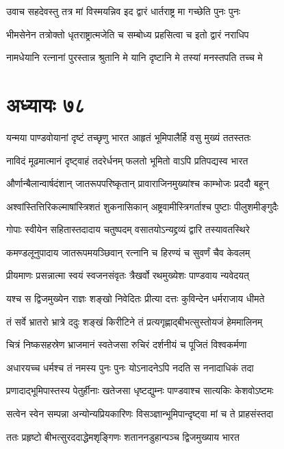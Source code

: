 \twolineshloka
{उवाच सहदेवस्तु तत्र मां विस्मयन्निव}
{इद द्वारं धार्तराष्ट्र मा गच्छेति पुनः पुनः}


\twolineshloka
{भीमसेनेन तत्रोक्तो धृतराष्ट्रात्मजेति च}
{सम्बोध्य प्रहसित्वा च इतो द्वारं नराधिप}


\twolineshloka
{नामधेयानि रत्नानां पुरस्तान्न श्रुतानि मे}
{यानि दृष्टानि मे तस्यां मनस्तपति तच्च मे}


\chapter{अध्यायः ७८}
\twolineshloka
{यन्मया पाण्डवोयानां दृष्टं तच्छृणु भारत}
{आहृतं भूमिपालैर्हि वसु मुख्यं ततस्ततः}


\twolineshloka
{नाविदं मूढमात्मानं दृष्ट्वाहं तदरेर्धनम्}
{फलतो भूमितो वाऽपि प्रतिपद्यस्व भारत}


\twolineshloka
{और्णान्बैलान्वार्षदंशान् जातरूपपरिष्कृतान्}
{प्रावाराजिनमुख्यांश्च काम्भोजः प्रददौ बहून्}


\twolineshloka
{अश्वांस्तित्तिरिकल्माषांस्त्रिशतं शुकनासिकान्}
{अष्ट्रवामीस्त्रिगर्ताश्च पुष्टाः पीलुशमीङ्गुदैः}


\twolineshloka
{गोपाः स्वीयेन सहितास्तदादाय चतुष्पदम्}
{वसातयोऽन्यद्द्रव्यं द्वारि तस्यावतस्थिरे}


\threelineshloka
{कमण्डलूनुपादाय जातरूपमयञ्छिवान्}
{रत्नानि च हिरण्यं च सुवर्णं चैव केवलम्}
{}


\twolineshloka
{प्रीयमाणः प्रसन्नात्मा स्वयं स्वजनसंवृतः}
{त्रैखर्वो रथमुख्येशः पाण्डवाय न्यवेदयत्}


\twolineshloka
{यश्च स द्विजमुख्येन राज्ञः शङ्खो निवेदितः}
{प्रीत्या दत्तः कुविन्देन धर्मराजाय धीमते}


\twolineshloka
{तं सर्वे भ्रातरो भ्रात्रे ददुः शङ्खं किरीटिने}
{तं प्रत्यगृह्णाद्बीभत्सुस्तोयजं हेममालिनम्}


\twolineshloka
{चित्रं निष्कसहस्रेण भ्राजमानं स्वतेजसा}
{रुचिरं दर्शनीयं च पूजितं विश्वकर्मणा}


\twolineshloka
{अधारयच्च धर्मश्च तं नमस्य पुनः पुनः}
{योऽनादनेऽपि नदति स ननादाधिकं तदा}


\twolineshloka
{प्रणादाद्भूमिपास्तस्य पेतुर्हीनाः खतेजसा}
{धृष्टद्युम्नः पाण्डवाश्च सात्यकिः केशवोऽष्टमः}


\twolineshloka
{सत्वेन स्वेन सम्पन्ना अन्योन्यप्रियकारिणः}
{विसञ्ज्ञान्भूमिपान्दृष्ट्वा मां च ते प्राहसंस्तदा}


\twolineshloka
{ततः प्रहृष्टो बीभत्सुरददाद्धेमशृङ्गिणः}
{शताननडुहान्पञ्च द्विजमुख्याय भारत}


